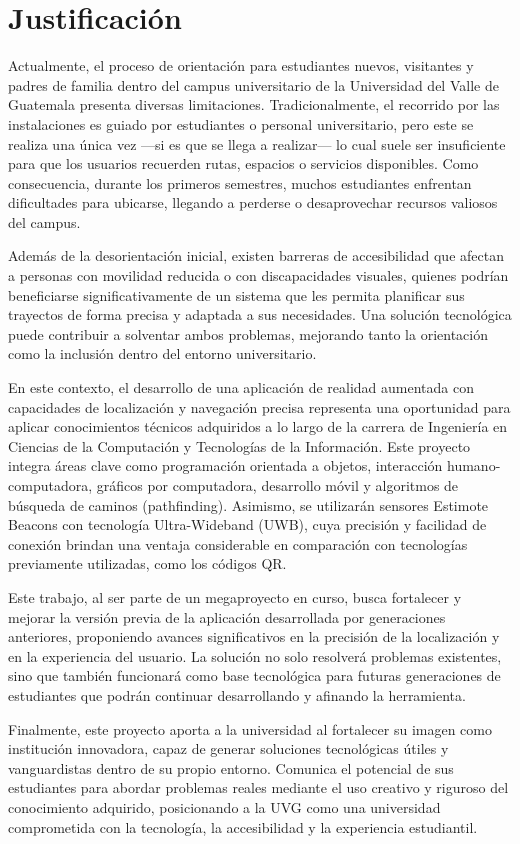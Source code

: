 \section{Justificación}
{\justify
Actualmente, el proceso de orientación para estudiantes nuevos, visitantes y padres de familia dentro del campus universitario de la Universidad del Valle de Guatemala presenta diversas limitaciones. Tradicionalmente, el recorrido por las instalaciones es guiado por estudiantes o personal universitario, pero este se realiza una única vez —si es que se llega a realizar— lo cual suele ser insuficiente para que los usuarios recuerden rutas, espacios o servicios disponibles. Como consecuencia, durante los primeros semestres, muchos estudiantes enfrentan dificultades para ubicarse, llegando a perderse o desaprovechar recursos valiosos del campus.

Además de la desorientación inicial, existen barreras de accesibilidad que afectan a personas con movilidad reducida o con discapacidades visuales, quienes podrían beneficiarse significativamente de un sistema que les permita planificar sus trayectos de forma precisa y adaptada a sus necesidades. Una solución tecnológica puede contribuir a solventar ambos problemas, mejorando tanto la orientación como la inclusión dentro del entorno universitario.

En este contexto, el desarrollo de una aplicación de realidad aumentada con capacidades de localización y navegación precisa representa una oportunidad para aplicar conocimientos técnicos adquiridos a lo largo de la carrera de Ingeniería en Ciencias de la Computación y Tecnologías de la Información. Este proyecto integra áreas clave como programación orientada a objetos, interacción humano-computadora, gráficos por computadora, desarrollo móvil y algoritmos de búsqueda de caminos (pathfinding). Asimismo, se utilizarán sensores Estimote Beacons con tecnología Ultra-Wideband (UWB), cuya precisión y facilidad de conexión brindan una ventaja considerable en comparación con tecnologías previamente utilizadas, como los códigos QR.

Este trabajo, al ser parte de un megaproyecto en curso, busca fortalecer y mejorar la versión previa de la aplicación desarrollada por generaciones anteriores, proponiendo avances significativos en la precisión de la localización y en la experiencia del usuario. La solución no solo resolverá problemas existentes, sino que también funcionará como base tecnológica para futuras generaciones de estudiantes que podrán continuar desarrollando y afinando la herramienta.

Finalmente, este proyecto aporta a la universidad al fortalecer su imagen como institución innovadora, capaz de generar soluciones tecnológicas útiles y vanguardistas dentro de su propio entorno. Comunica el potencial de sus estudiantes para abordar problemas reales mediante el uso creativo y riguroso del conocimiento adquirido, posicionando a la UVG como una universidad comprometida con la tecnología, la accesibilidad y la experiencia estudiantil.}

\newpage